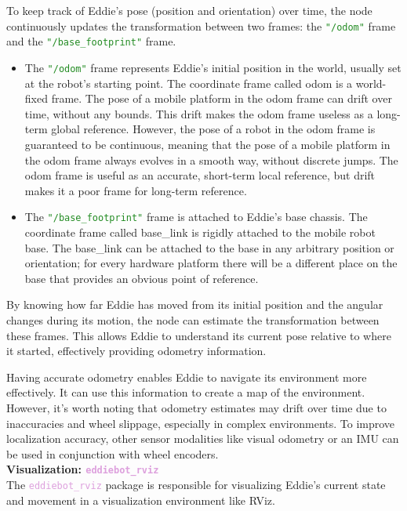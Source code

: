 To keep track of Eddie's pose (position and orientation) over time, the node continuously updates the transformation between two frames: the \textcolor{ForestGreen}{\texttt{"/odom"}} frame and the  \textcolor{ForestGreen}{\texttt{"/base\_footprint"}} frame. 
\begin{itemize}
    \item The \textcolor{ForestGreen}{\texttt{"/odom"}} frame represents Eddie's initial position in the world, usually set at the robot's starting point. The coordinate frame called odom is a world-fixed frame. The pose of a mobile platform in the odom frame can drift over time, without any bounds. This drift makes the odom frame useless as a long-term global reference. However, the pose of a robot in the odom frame is guaranteed to be continuous, meaning that the pose of a mobile platform in the odom frame always evolves in a smooth way, without discrete jumps. The odom frame is useful as an accurate, short-term local reference, but drift makes it a poor frame for long-term reference.
    \item The \textcolor{ForestGreen}{\texttt{"/base\_footprint"}} frame is attached to Eddie's base chassis. The coordinate frame called base\_link is rigidly attached to the mobile robot base. The base\_link can be attached to the base in any arbitrary position or orientation; for every hardware platform there will be a different place on the base that provides an obvious point of reference. 
\end{itemize}
By knowing how far Eddie has moved from its initial position and the angular changes during its motion, the node can estimate the transformation between these frames. This allows Eddie to understand its current pose relative to where it started, effectively providing odometry information.

Having accurate odometry enables Eddie to navigate its environment more effectively. It can use this information to create a map of the environment. However, it's worth noting that odometry estimates may drift over time due to inaccuracies and wheel slippage, especially in complex environments. To improve localization accuracy, other sensor modalities like visual odometry or an IMU can be used in conjunction with wheel encoders.\\

\textbf{Visualization: \textcolor{Plum}{\texttt{\Large eddiebot\_rviz}}}\\
The \textcolor{Plum}{\texttt{eddiebot\_rviz}} package is responsible for visualizing Eddie's current state and movement in a visualization environment like RViz. 

